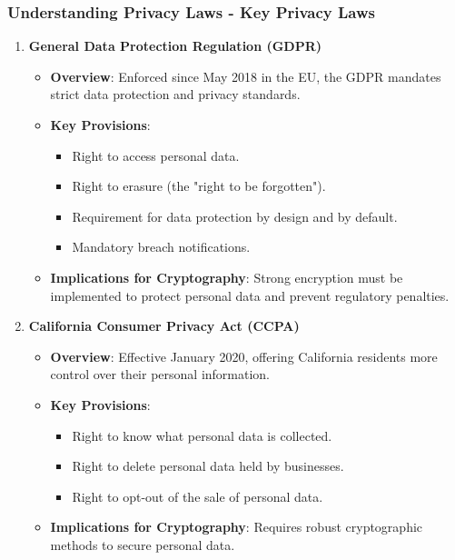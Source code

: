 \documentclass{beamer}
\begin{document}
\begin{frame}[fragile]
    \frametitle{Understanding Privacy Laws - Key Privacy Laws}
    \begin{enumerate}
        \item \textbf{General Data Protection Regulation (GDPR)}
        \begin{itemize}
            \item \textbf{Overview}: Enforced since May 2018 in the EU, the GDPR mandates strict data protection and privacy standards.
            \item \textbf{Key Provisions}:
            \begin{itemize}
                \item Right to access personal data.
                \item Right to erasure (the "right to be forgotten").
                \item Requirement for data protection by design and by default.
                \item Mandatory breach notifications.
            \end{itemize}
            \item \textbf{Implications for Cryptography}: Strong encryption must be implemented to protect personal data and prevent regulatory penalties.
        \end{itemize}

        \item \textbf{California Consumer Privacy Act (CCPA)}
        \begin{itemize}
            \item \textbf{Overview}: Effective January 2020, offering California residents more control over their personal information.
            \item \textbf{Key Provisions}:
            \begin{itemize}
                \item Right to know what personal data is collected.
                \item Right to delete personal data held by businesses.
                \item Right to opt-out of the sale of personal data.
            \end{itemize}
            \item \textbf{Implications for Cryptography}: Requires robust cryptographic methods to secure personal data.
        \end{itemize}
    \end{enumerate}
\end{frame}
\end{document}
